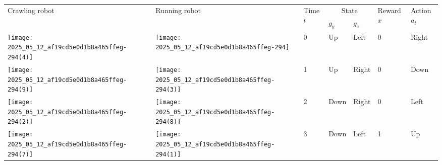 \documentclass[10pt]{article}
\begin{document}
\begin{center}
\begin{tabular}{|l|l|l|l|l|l|l|}
\hline
\multirow[t]{2}{*}{Crawling robot} & \multirow[t]{2}{*}{Running robot} & \multirow{2}{*}{Time $t$} & \multicolumn{2}{|c|}{State} & \multirow{2}{*}{Reward $x$} & \multirow{2}{*}{Action $a_{t}$} \\
\
hline
 &  &  & $g_{y}$ & $g_{x}$ &  &  \\
\hline
\texttt{[image: 2025\_05\_12\_af19cd5e0d1b8a465ffeg-294(4)]}
 & \texttt{[image: 2025\_05\_12\_af19cd5e0d1b8a465ffeg-294]}
 & 0 & Up & Left & 0 & Right \\
\hline
\texttt{[image: 2025\_05\_12\_af19cd5e0d1b8a465ffeg-294(9)]}
 & \texttt{[image: 2025\_05\_12\_af19cd5e0d1b8a465ffeg-294(3)]}
 & 1 & Up & Right & 0 & Down \\
\hline
\texttt{[image: 2025\_05\_12\_af19cd5e0d1b8a465ffeg-294(2)]}
 & \texttt{[image: 2025\_05\_12\_af19cd5e0d1b8a465ffeg-294(8)]}
 & 2 & Down & Right & 0 & Left \\
\hline
\texttt{[image: 2025\_05\_12\_af19cd5e0d1b8a465ffeg-294(7)]}
 & \texttt{[image: 2025\_05\_12\_af19cd5e0d1b8a465ffeg-294(1)]}
 & 3 & Down & Left & 1 & Up \\
\hline
\end{tabular}
\end{center}
\end{document}
